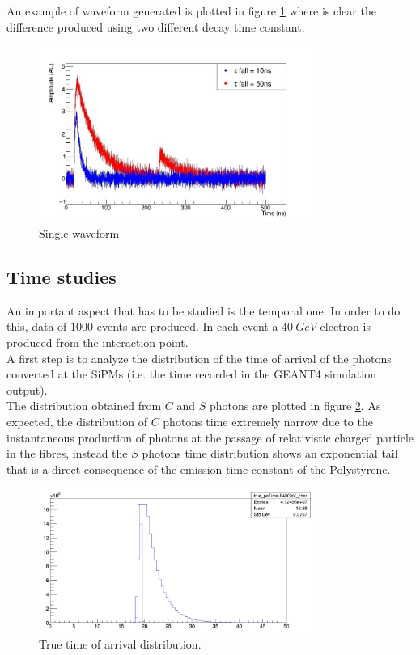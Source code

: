 An example of waveform generated is plotted in figure \ref{fig:diff_wf} where is clear the difference produced using two different decay time constant.

\begin{figure}
	\centering
	\includegraphics[width=0.8\textwidth]{IMG/SingleWaveform}
	\caption{Single waveform}
	\label{fig:diff_wf}
\end{figure}

\subsection{Time studies} \label{subsec:Time}
An important aspect that has to be studied is the temporal one.
In order to do this, data of $1000$ events are produced. In each event a $40\ GeV$ electron is produced from the interaction point.\\
A first step is to analyze the distribution of the time of arrival of the photons converted at the SiPMs (i.e. the time recorded in the GEANT4 simulation output).\\
The distribution obtained from $C$ and $S$ photons are plotted in figure \ref{fig:true_toa_dist}.
As expected, the distribution of $C$ photons time extremely narrow due to the instantaneous production of photons at the passage of relativistic charged particle in the fibres, instead the $S$ photons time distribution shows an exponential tail that is a direct consequence of the emission time constant of the Polystyrene.\\

\begin{figure}
	\centering
	\includegraphics[width=0.8\textwidth]{IMG/true_toa_dist}
	\caption{True time of arrival distribution.}
	\label{fig:true_toa_dist}
\end{figure}

